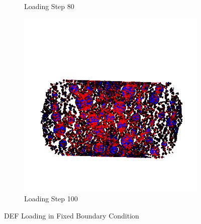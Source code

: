 \begin{figure}[ht]
\begin{subfigure}{.33\textwidth}
      \caption{Loading Step 80}
    \end{subfigure}%
    \begin{subfigure}{.33\textwidth}
      \centering
      \includegraphics[width=1.0\linewidth]{Files/A30X-5C_3_IS/DEP50-STEP(120).png}
      \caption{Loading Step 100}
    \end{subfigure}

    

  \caption{DEF Loading in Fixed Boundary Condition}
  \label{fig:DEF_Loading}
\end{figure}


